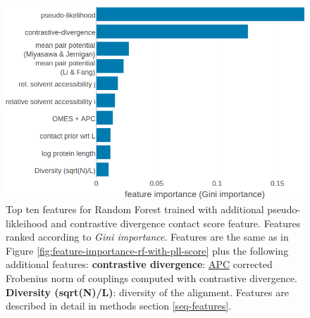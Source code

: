 \documentclass[11pt,a4paper,twoside]{book}
\theoremstyle{definition}
\theoremstyle{definition}
\theoremstyle{remark}
\begin{document}
\begin{figure}

{\centering \includegraphics[width=1\linewidth]{img/random_forest_contact_prior/additional_contat_score_features/feature_random_forest_nestimators1000_maxfeatures030_cd_pll} 

}

\caption{Top ten features
for Random Forest trained with additional pseudo-likleihood and
contrastive divergence contact score feature. Features ranked according
to \emph{Gini importance}. Features are the same as in Figure
\ref{fig:feature-importance-rf-with-pll-score} plus the following
additional features: \textbf{contrastive divergence}:
\protect\hyperlink{abbrev}{APC} corrected Frobenius norm of couplings
computed with contrastive divergence. \textbf{Diversity (sqrt(N)/L)}:
diversity of the alignment. Features are described in detail in methods
section \ref{seq-features}.}\label{fig:feature-importance-rf-with-pll-cd-score}
\end{figure}
\end{document}
